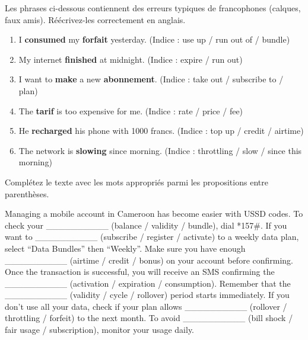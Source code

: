 \documentclass[11pt]{article}
\newcommand{\cle}[1]{{\popxbold\color{popdark}#1}}
\begin{document}
\begin{exercice}
Les phrases ci-dessous contiennent des erreurs typiques de francophones (calques, faux amis). Réécrivez-les correctement en anglais.
\begin{enumerate}
    \item I \textbf{consumed} my \textbf{forfait} yesterday. (Indice : \cle{use up} / \cle{run out of} / \cle{bundle})
    \item My internet \textbf{finished} at midnight. (Indice : \cle{expire} / \cle{run out})
    \item I want to \textbf{make} a new \textbf{abonnement}. (Indice : \cle{take out} / \cle{subscribe to} / \cle{plan})
    \item The \textbf{tarif} is too expensive for me. (Indice : \cle{rate} / \cle{price} / \cle{fee})
    \item He \textbf{recharged} his phone with 1000 francs. (Indice : \cle{top up} / \cle{credit} / \cle{airtime})
    \item The network is \textbf{slowing} since morning. (Indice : \cle{throttling} / \cle{slow} / \cle{since this morning})
\end{enumerate}
\end{exercice}

\begin{exercice}
Complétez le texte avec les mots appropriés parmi les propositions entre parenthèses.

\begin{textebox}
Managing a mobile account in Cameroon has become easier with USSD codes. To check your \_\_\_\_\_\_\_\_\_\_ (balance / validity / bundle), dial *157\#. If you want to \_\_\_\_\_\_\_\_\_\_ (subscribe / register / activate) to a weekly data plan, select “Data Bundles” then “Weekly”. Make sure you have enough \_\_\_\_\_\_\_\_\_\_ (airtime / credit / bonus) on your account before confirming. Once the transaction is successful, you will receive an SMS confirming the \_\_\_\_\_\_\_\_\_\_ (activation / expiration / consumption). Remember that the \_\_\_\_\_\_\_\_\_\_ (validity / cycle / rollover) period starts immediately. If you don't use all your data, check if your plan allows \_\_\_\_\_\_\_\_\_\_ (rollover / throttling / forfeit) to the next month. To avoid \_\_\_\_\_\_\_\_\_\_ (bill shock / fair usage / subscription), monitor your usage daily.
\end{textebox}
\end{exercice}
\end{document}
